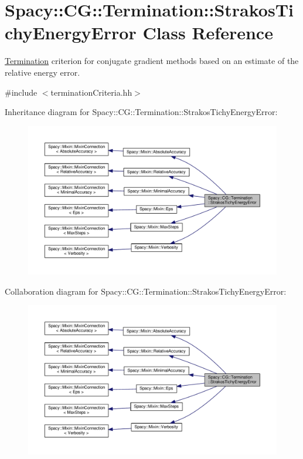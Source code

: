 \hypertarget{classSpacy_1_1CG_1_1Termination_1_1StrakosTichyEnergyError}{}\section{Spacy\+:\+:C\+G\+:\+:Termination\+:\+:Strakos\+Tichy\+Energy\+Error Class Reference}
\label{classSpacy_1_1CG_1_1Termination_1_1StrakosTichyEnergyError}


\hyperlink{namespaceSpacy_1_1CG_1_1Termination}{Termination} criterion for conjugate gradient methods based on an estimate of the relative energy error.  




{\ttfamily \#include $<$termination\+Criteria.\+hh$>$}



Inheritance diagram for Spacy\+:\+:C\+G\+:\+:Termination\+:\+:Strakos\+Tichy\+Energy\+Error\+:\nopagebreak
\begin{figure}[H]
\begin{center}
\leavevmode
\includegraphics[width=350pt]{classSpacy_1_1CG_1_1Termination_1_1StrakosTichyEnergyError__inherit__graph}
\end{center}
\end{figure}


Collaboration diagram for Spacy\+:\+:C\+G\+:\+:Termination\+:\+:Strakos\+Tichy\+Energy\+Error\+:\nopagebreak
\begin{figure}[H]
\begin{center}
\leavevmode
\includegraphics[width=350pt]{classSpacy_1_1CG_1_1Termination_1_1StrakosTichyEnergyError__coll__graph}
\end{center}
\end{figure}
